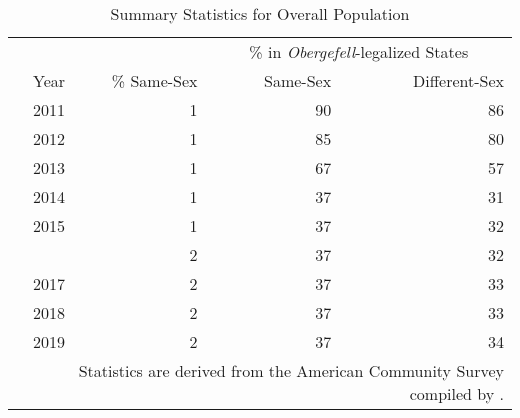 \begin{table}[htbp]

\caption{Summary Statistics for Overall Population}
\label{tab:overall_table}
\centering
\begin{tabular}[t]{rrrr}
\toprule
\multicolumn{2}{c}{ } & \multicolumn{2}{c}{\% in \textit{Obergefell}-legalized States} \\
\cmidrule(l{3pt}r{3pt}){3-4}
Year & \% Same-Sex & Same-Sex & Different-Sex\\
\midrule
2011 & 1 & 90 & 86\\
2012 & 1 & 85 & 80\\
2013 & 1 & 67 & 57\\
2014 & 1 & 37 & 31\\
2015 & 1 & 37 & 32\\
\addlinespace
2016 & 2 & 37 & 32\\
2017 & 2 & 37 & 33\\
2018 & 2 & 37 & 33\\
2019 & 2 & 37 & 34\\
\bottomrule
\multicolumn{4}{p{0.6\linewidth}}{\footnotesize Statistics are derived from the American Community Survey compiled by \citet{28}.} \\
\end{tabular}
\end{table}
